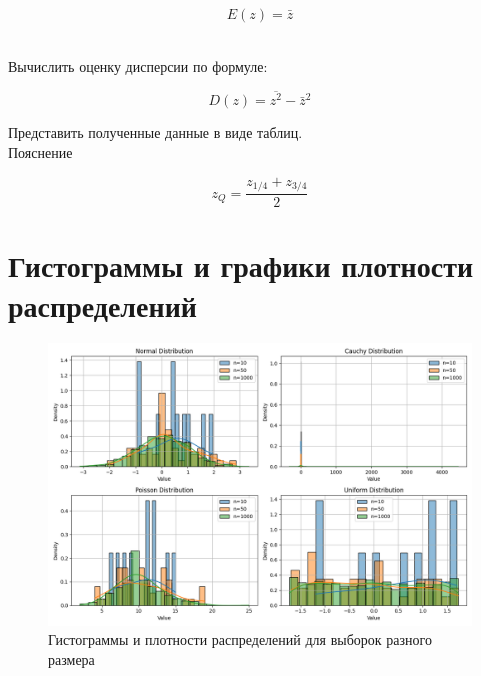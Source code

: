 \documentclass[a4paper]{article}
\begin{document}
    $$
    E(z)=\bar{z}
    $$


    \\  Вычислить оценку дисперсии по формуле:

    $$
    D(z)=\overline{z^2}-\bar{z}^2
    $$


    Представить полученные данные в виде таблиц.
    \\ Пояснение

    $$
    z_Q=\frac{z_{1 / 4}+z_{3 / 4}}{2}
    $$


    \section{Гистограммы и графики плотности распределений}\label{sec:----}
    \begin{figure}[H]
        \centering
        \includegraphics[width=1\textwidth]{../histograms} %
        \caption{Гистограммы и плотности распределений для выборок разного размера}\label{fig:figure}
    \end{figure}

\newpage
\end{document}
